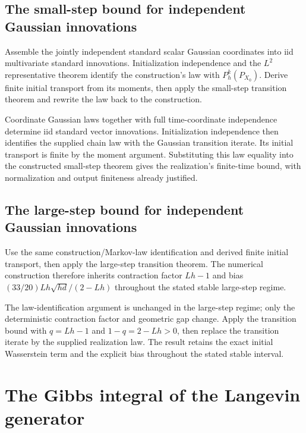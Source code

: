 \documentclass[11pt,a4paper]{article}
\begin{document}
\subsection{\texorpdfstring{The small-step bound for independent Gaussian innovations}{The small-step bound for independent Gaussian innovations}}


Assemble the jointly independent standard scalar Gaussian coordinates into iid multivariate standard innovations. Initialization independence and the \(L^2\) representative theorem identify the construction's law with \(P_h^k(P_{X_0})\). Derive finite initial transport from its moments, then apply the small-step transition theorem and rewrite the law back to the construction.



Coordinate Gaussian laws together with full time-coordinate independence determine iid standard vector innovations. Initialization independence then identifies the supplied chain law with the Gaussian transition iterate. Its initial transport is finite by the moment argument. Substituting this law equality into the constructed small-step theorem gives the realization's finite-time bound, with normalization and output finiteness already justified.


\subsection{\texorpdfstring{The large-step bound for independent Gaussian innovations}{The large-step bound for independent Gaussian innovations}}


Use the same construction/\allowbreak{}Markov-law identification and derived finite initial transport, then apply the large-step transition theorem. The numerical construction therefore inherits contraction factor \(Lh-1\) and bias \((33/20)Lh\sqrt{hd}/(2-Lh)\) throughout the stated stable large-step regime.



The law-identification argument is unchanged in the large-step regime; only the deterministic contraction factor and geometric gap change. Apply the transition bound with \(q=Lh-1\) and \(1-q=2-Lh>0\), then replace the transition iterate by the supplied realization law. The result retains the exact initial Wasserstein term and the explicit bias throughout the stated stable interval.


\section{\texorpdfstring{The Gibbs integral of the Langevin generator}{The Gibbs integral of the Langevin generator}}
\end{document}
